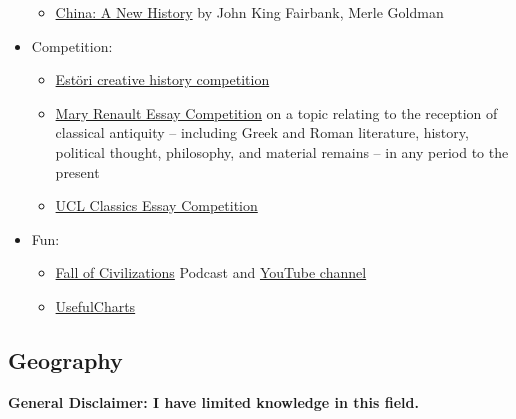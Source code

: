 \documentclass{article}
\begin{document}
\begin{itemize}
\begin{itemize}
        \item \href{https://www.goodreads.com/book/show/178794.China}{China: A New History} by John King Fairbank, Merle Goldman
    \end{itemize}
    \item Competition:
    \begin{itemize}
        \item \href{https://www.estori.hu/}{Estöri creative history competition}
        \item \href{https://www.st-hughs.ox.ac.uk/prospective-students/outreach-at-st-hughs/essay-competitions/the-mary-renault-prize/}{Mary Renault Essay Competition} on a topic relating to the reception of classical antiquity – including Greek and Roman literature, history, political thought, philosophy, and material remains – in any period to the present
        \item \href{https://www.ucl.ac.uk/classics/outreach/essay-competition}{UCL Classics Essay Competition}
    \end{itemize}
    \item Fun:
    \begin{itemize}
        \item \href{https://fallofcivilizationspodcast.com/}{Fall of Civilizations} Podcast and \href{https://www.youtube.com/@FallofCivilizations}{YouTube channel}
        \item \href{https://www.youtube.com/@UsefulCharts}{UsefulCharts}
    \end{itemize}
\end{itemize}

\subsection{Geography}
\textbf{General Disclaimer: I have limited knowledge in this field.}
\end{document}

